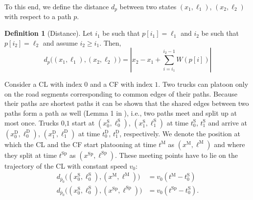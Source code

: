 \documentclass[letterpaper,10pt,conference,twocolumn]{IEEEtran}
\newcommand{\op}[1]{\mathrm{#1}}
\theoremstyle{definition}
\newtheorem{defi}{Definition}
\begin{document}
To this end, we define the distance $d_p$ between two states $(x_1,\ell_1)$, $(x_2,\ell_2)$ with respect to a path $p$. 
\begin{defi}[Distance]
Let $i_1$ be such that $p[i_1] = \ell_1$ and $i_2$ be such that $p[i_2] = \ell_2$ and assume $i_2 \geq i_1$. Then,
\begin{equation}
  d_p\big((x_1,\ell_1),(x_2,\ell_2)\big) =
   \left|x_2 - x_1 + \sum\limits_{i = i_1}^{i_2 -1} W(p[i])\right|
\end{equation}
\end{defi}
Consider a CL with index $0$ and a CF with index $1$.
Two trucks can platoon only on the road segments corresponding to common edges of their paths. Because their paths are shortest paths it can be shown that the shared edges between two paths form a path as well (Lemma 1 in \cite{ACCpaper}), i.e., two paths meet and split up at most once. Trucks $0$,$1$ start at $(x_0^\op{S},\ell_0^\op{S})$, $(x_1^\op{S},\ell_1^\op{S})$ at time $t_0^\op{S}$, $t_1^\op{S}$ and arrive at $(x_0^\op{D},\ell_0^\op{D})$, $(x_1^\op{D},\ell_1^\op{D})$ at time $t_0^\op{D}$, $t_1^\op{D}$, respectively.
We denote the position at which the CL and the CF start platooning at time $t^\op{M}$ as $(x^\op{M},\ell^\op{M})$ and where they split at time $t^\op{Sp}$ as $(x^\op{Sp},\ell^\op{Sp})$. These meeting points have to lie on the trajectory of the CL with constant speed $v_{0}$:
\begin{align*}
 d_{\bar{p}_0}\big((x_0^\op{S},\ell_0^\op{S}),(x^\op{M},\ell^\op{M})\big) &= v_{0} (t^\op{M} - t_0^\op{S})\\
 d_{\bar{p}_0}\big((x_0^\op{S},\ell_0^\op{S}),(x^\op{Sp},\ell^\op{Sp})\big) &= v_{0} (t^\op{Sp} - t_{0}^\op{S}).
\end{align*}
\end{document}
